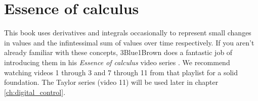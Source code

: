 \section{Essence of calculus}

This book uses derivatives and integrals occasionally to represent small changes
in values and the infintessimal sum of values over time respectively. If you
aren't already familiar with these concepts, 3Blue1Brown does a fantastic job of
introducing them in his \textit{Essence of calculus} video series
\cite{bib:essence_of_calculus}. We recommend watching videos 1 through 3 and 7
through 11 from that playlist for a solid foundation. The Taylor series (video
11) will be used later in chapter \ref{ch:digital_control}.
